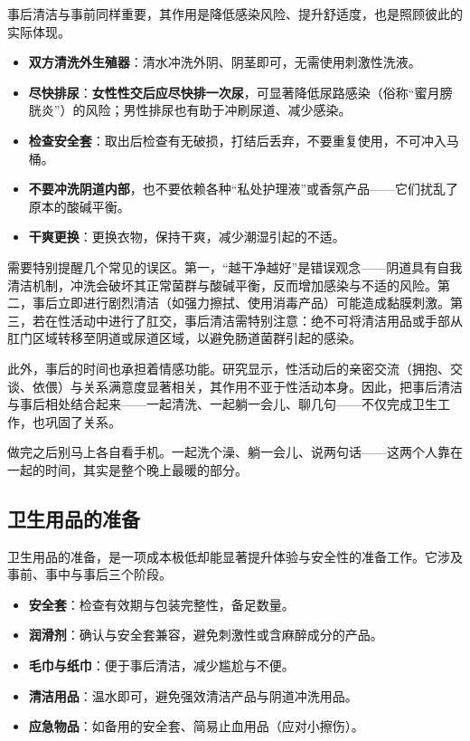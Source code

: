 \documentclass[12pt,UTF8]{ctexbook}
\begin{document}
事后清洁与事前同样重要，其作用是降低感染风险、提升舒适度，也是照顾彼此的实际体现。

\begin{itemize}
\item \textbf{双方清洗外生殖器}：清水冲洗外阴、阴茎即可，无需使用刺激性洗液。
\item \textbf{尽快排尿}：\textbf{女性性交后应尽快排一次尿}，可显著降低尿路感染（俗称“蜜月膀胱炎”）的风险；男性排尿也有助于冲刷尿道、减少感染。
\item \textbf{检查安全套}：取出后检查有无破损，打结后丢弃，不要重复使用，不可冲入马桶。
\item \textbf{不要冲洗阴道内部}，也不要依赖各种“私处护理液”或香氛产品——它们扰乱了原本的酸碱平衡。
\item \textbf{干爽更换}：更换衣物，保持干爽，减少潮湿引起的不适。
\end{itemize}

需要特别提醒几个常见的误区。第一，“越干净越好”是错误观念——阴道具有自我清洁机制，冲洗会破坏其正常菌群与酸碱平衡，反而增加感染与不适的风险。第二，事后立即进行剧烈清洁（如强力擦拭、使用消毒产品）可能造成黏膜刺激。第三，若在性活动中进行了肛交，事后清洁需特别注意：绝不可将清洁用品或手部从肛门区域转移至阴道或尿道区域，以避免肠道菌群引起的感染。

此外，事后的时间也承担着情感功能。研究显示，性活动后的亲密交流（拥抱、交谈、依偎）与关系满意度显著相关，其作用不亚于性活动本身。因此，把事后清洁与事后相处结合起来——一起清洗、一起躺一会儿、聊几句——不仅完成卫生工作，也巩固了关系。

\begin{tcolorbox}[colback=pink!5!white,colframe=red!50!black,title=贴心小叮咛]
做完之后别马上各自看手机。一起洗个澡、躺一会儿、说两句话——这两个人靠在一起的时间，其实是整个晚上最暖的部分。
\end{tcolorbox}

\subsection{卫生用品的准备}

卫生用品的准备，是一项成本极低却能显著提升体验与安全性的准备工作。它涉及事前、事中与事后三个阶段。

\begin{itemize}
\item \textbf{安全套}：检查有效期与包装完整性，备足数量。
\item \textbf{润滑剂}：确认与安全套兼容，避免刺激性或含麻醉成分的产品。
\item \textbf{毛巾与纸巾}：便于事后清洁，减少尴尬与不便。
\item \textbf{清洁用品}：温水即可，避免强效清洁产品与阴道冲洗用品。
\item \textbf{应急物品}：如备用的安全套、简易止血用品（应对小擦伤）。
\end{itemize}
\end{document}
